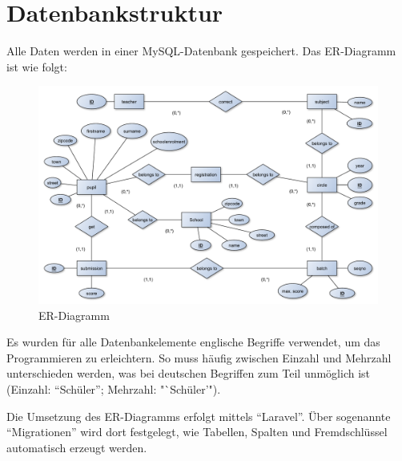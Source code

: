 \section{Datenbankstruktur}

Alle Daten werden in einer MySQL-Datenbank gespeichert. Das ER-Diagramm ist wie folgt: 

\begin{figure}[ht]
	\centering
	\includegraphics[scale=.48]{bilder/ER_Modell_englisch.pdf}
	\caption{ER-Diagramm}
	\label{abb:beispiel}
\end{figure}

Es wurden für alle Datenbankelemente englische Begriffe verwendet, um das Programmieren zu erleichtern. So muss häufig zwischen Einzahl und Mehrzahl unterschieden werden, was bei deutschen Begriffen zum Teil unmöglich ist (Einzahl: "`Schüler"'; Mehrzahl: "`Schüler'").

Die Umsetzung des ER-Diagramms erfolgt mittels "`Laravel"'. Über sogenannte "`Migrationen"' wird dort festgelegt, wie Tabellen, Spalten und Fremdschlüssel automatisch erzeugt werden.